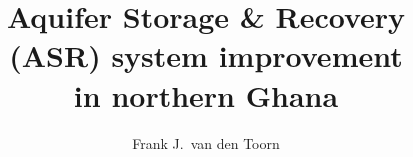 \documentclass[whitelogo,11pt,a4paper]{tudelft-report}
\numberwithin{equation}{chapter}
\begin{document}
\frontmatter

 
\title[tudelft-white]{Aquifer Storage \& Recovery \\ (ASR) system improvement \\ in northern Ghana}
\author[tudelft-white]{Frank J.\ van den Toorn}





\tableofcontents
\listoffigures
\listoftables

\mainmatter



%

\end{document}
